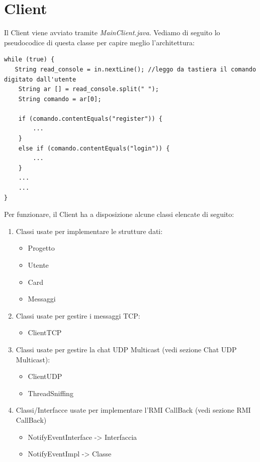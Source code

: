\documentclass{article} %
\begin{document}
\section{Client}
Il Client viene avviato tramite {\itshape MainClient.java}. Vediamo di seguito lo pseudocodice di questa classe per capire meglio l'architettura:
\begin{lstlisting}
while (true) {
   String read_console = in.nextLine(); //leggo da tastiera il comando digitato dall'utente
	String ar [] = read_console.split(" ");
	String comando = ar[0];
	
	if (comando.contentEquals("register")) {
	    ...
	}
	else if (comando.contentEquals("login")) {
	    ...
	}
	...
	...
}
\end{lstlisting}
Per funzionare, il Client ha a disposizione alcune classi elencate di seguito:
\begin{enumerate} 
\item Classi usate per implementare le strutture dati:
	\begin{itemize} 
	\item Progetto
	\item Utente
	\item Card
	\item Messaggi
	\end{itemize} 
\item Classi usate per gestire i messaggi TCP:
	\begin{itemize}
	\item ClientTCP
	\end{itemize}
\item Classi usate per gestire la chat UDP Multicast (vedi sezione Chat UDP Multicast):
	\begin{itemize}
	\item ClientUDP
	\item ThreadSniffing
	\end{itemize}
\item Classi/Interfacce usate per implementare l'RMI CallBack (vedi sezione RMI CallBack)
	\begin{itemize}
	\item NotifyEventInterface -> Interfaccia
	\item NotifyEventImpl -> Classe
	\end{itemize}
\end{enumerate}
\end{document}
